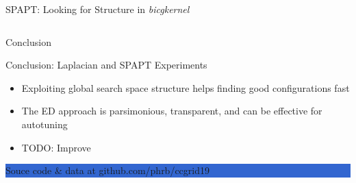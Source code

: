 \documentclass[10pt, compress, aspectratio=169, xcolor={table,usenames,dvipsnames}]{beamer}
\begin{document}
\begin{frame}[label={sec:org142a970}]{SPAPT: Looking for Structure in \emph{bicgkernel}}
\begin{columns}
\begin{column}{0.5\columnwidth}
{\begin{center}
\end{center}
}
\end{column}
\end{columns}
\end{frame}
\begin{frame}[label={sec:orgda8065f}]{Conclusion}
\begin{block}{Conclusion: Laplacian and SPAPT Experiments}
\begin{itemize}
\item Exploiting   global   search   space   structure   helps   finding   good
configurations fast
\item The ED approach is parsimonious, transparent, and can be effective for autotuning
\item TODO: Improve
\end{itemize}

\begin{center}
\colorbox{Highlight}{\parbox[c]{0.54\textwidth}{\centering \alert{Souce code \& data} at \alert{github.com/phrb/ccgrid19}}}
\end{center}
\end{block}
\end{frame}
\end{document}
